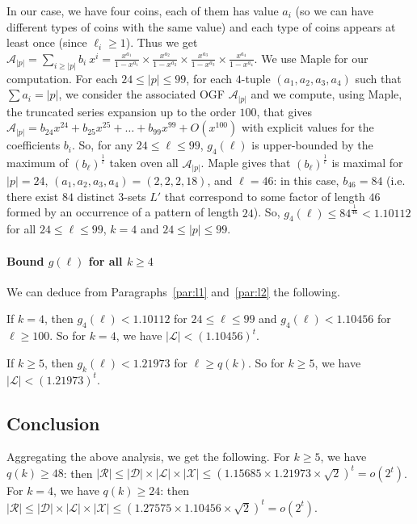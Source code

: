 \documentclass[]{elsart}
\begin{document}
In our case, we have four coins, each of them has value $a_i$ (so we
can have different types of coins with the same value) and each type
of coins appears at least once (since $\ell_i\ge 1$). Thus we get
$\mathcal{A}_{|p|}=\sum_{i\ge |p|}b_i\ x^i =
\frac{x^{a_1}}{1-x^{a_1}}\times\frac{x^{a_2}}{1-x^{a_2}}
\times\frac{x^{a_3}}{1-x^{a_3}}\times\frac{x^{a_4}}{1-x^{a_4}}$.
We use Maple for our computation. For each $24\le |p|\le 99$, for each
$4$-tuple $(a_1,a_2,a_3,a_4)$ such that $\sum a_i = |p|$, we consider
the associated OGF $\mathcal{A}_{|p|}$ and we compute, using Maple,
the truncated series expansion up to the order $100$, that gives
$\mathcal{A}_{|p|} = b_{24} x^{24} + b_{25} x^{25} + \ldots + b_{99}
x^{99} + O(x^{100})$ with explicit values for the coefficients $b_i$.
So, for any $24\le \ell\le 99$, $g_4(\ell)$ is upper-bounded by the
maximum of $(b_\ell)^{\frac{1}{\ell}}$ taken oven all
$\mathcal{A}_{|p|}$. Maple gives that $(b_\ell)^{\frac{1}{\ell}}$ is
maximal for $|p|=24$, $(a_1,a_2,a_3,a_4) = (2,2,2,18)$, and $\ell=46$:
in this case, $b_{46}=84$ (i.e. there exist $84$ distinct $3$-sets
$L'$ that correspond to some factor of length $46$ formed by an
occurrence of a pattern of length $24$). So, $g_4(\ell)\le
84^\frac{1}{46}< 1.10112$ for all $24\le \ell\le 99$, $k=4$ and
$24\le |p|\le 99$.

\paragraph{Bound $g(\ell)$ for all $k\ge 4$}

We can deduce from Paragraphs~\ref{par:l1} and~\ref{par:l2} the
following.

If $k=4$, then $g_4(\ell)< 1.10112$ for $24\le\ell\le 99$ and
$g_4(\ell)< 1.10456$ for $\ell\ge 100$. So for $k=4$, we have
$|\mathcal{L}|< (1.10456)^t$.

If $k\ge 5$, then $g_k(\ell)< 1.21973$ for $\ell\ge q(k)$.
So for $k\ge 5$, we have $|\mathcal{L}|< (1.21973)^t$.

\subsection{Conclusion}

Aggregating the above analysis, we get the following. For $k\ge 5$, we
have $q(k)\ge 48$: then $|\mathcal{R}|\le
|\mathcal{D}|\times|\mathcal{L}|\times|\mathcal{X}|\le (1.15685\times
1.21973\times\sqrt{2})^t =o(2^t)$. For $k=4$, we have $q(k)\ge 24$:
then
$|\mathcal{R}|\le|\mathcal{D}|\times|\mathcal{L}|\times|\mathcal{X}|
\le(1.27575\times1.10456\times\sqrt{2})^t = o(2^t)$.
\end{document}

